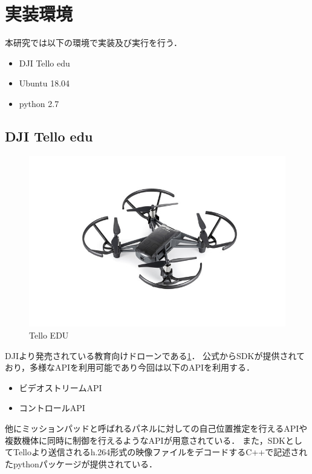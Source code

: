 \section{実装環境}
\label{env}

本研究では以下の環境で実装及び実行を行う．
\begin{itemize}
  \item DJI Tello edu
  \item Ubuntu 18.04
  \item python 2.7
\end{itemize}

\subsection{DJI Tello edu}

\begin{figure}[htbp]
  \begin{center}
    \includegraphics[clip,width=15.0cm]{img/Telloedu.jpg}
    \caption{Tello EDU}
    \label{fig:tello}
  \end{center}
\end{figure}
DJIより発売されている教育向けドローンである\ref{fig:tello}．
公式からSDKが提供されており，多様なAPIを利用可能であり今回は以下のAPIを利用する．
\begin{itemize}
  \item ビデオストリームAPI
  \item コントロールAPI
\end{itemize}

他にミッションパッドと呼ばれるパネルに対しての自己位置推定を行えるAPIや複数機体に同時に制御を行えるようなAPIが用意されている．
また，SDKとしてTelloより送信されるh.264形式の映像ファイルをデコードするC++で記述されたpythonパッケージが提供されている．